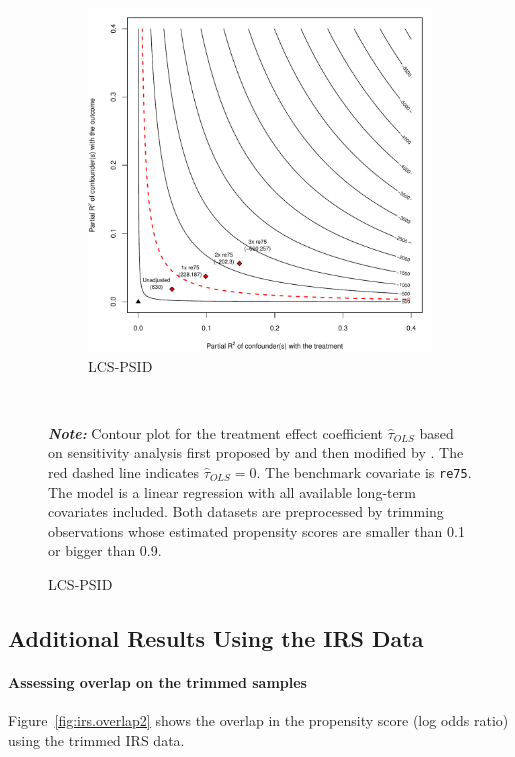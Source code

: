 \documentclass[letterpaper,12pt,leqno]{article}
\begin{document}
\begin{figure}[!ht]
\begin{minipage}[c]{1\textwidth}
\begin{subfigure}{0.45\linewidth}
            \includegraphics[width=\linewidth]{sens_lcs_psid.pdf}
            \caption{LCS-PSID}
        \end{subfigure}
    \end{minipage}%
    \\\raggedright
     {\footnotesize\textbf{\textit{Note:}} Contour plot for the treatment effect coefficient $\hat{\tau}_{OLS}$ based on sensitivity analysis first proposed by \citet{imbens2003} and then modified by \citet{cinelli2020making}. The red dashed line indicates $\hat\tau_{OLS} = 0$. The benchmark covariate is \texttt{re75}. The model is a linear regression with all available long-term covariates included. Both datasets are preprocessed by trimming observations whose estimated propensity scores are smaller than 0.1 or bigger than 0.9.}
\end{figure}
\clearpage



\subsection{Additional Results Using the IRS Data}

\paragraph{Assessing overlap on the trimmed samples} Figure~\ref{fig:irs.overlap2} shows the overlap in the propensity score (log odds ratio) using the trimmed IRS data. 
\end{document}
